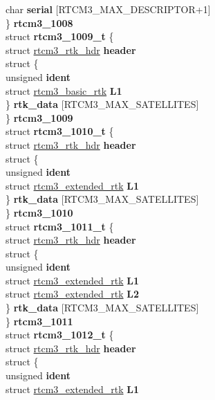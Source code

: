 \begin{DoxyCompactItemize}
{\begin{tabbing}
\>\>char {\bfseries serial} \mbox{[}RTCM3\_MAX\_DESCRIPTOR+1\mbox{]}\\
\>\} {\bfseries rtcm3\_1008}\\
\>struct {\bfseries rtcm3\_1009\_t} \{\\
\>\>struct \hyperlink{structrtcm3__rtk__hdr}{rtcm3\_rtk\_hdr} {\bfseries header}\\
\>\>struct \{\\
\>\>\>unsigned {\bfseries ident}\\
\>\>\>struct \hyperlink{structrtcm3__basic__rtk}{rtcm3\_basic\_rtk} {\bfseries L1}\\
\>\>\} {\bfseries rtk\_data} \mbox{[}RTCM3\_MAX\_SATELLITES\mbox{]}\\
\>\} {\bfseries rtcm3\_1009}\\
\>struct {\bfseries rtcm3\_1010\_t} \{\\
\>\>struct \hyperlink{structrtcm3__rtk__hdr}{rtcm3\_rtk\_hdr} {\bfseries header}\\
\>\>struct \{\\
\>\>\>unsigned {\bfseries ident}\\
\>\>\>struct \hyperlink{structrtcm3__extended__rtk}{rtcm3\_extended\_rtk} {\bfseries L1}\\
\>\>\} {\bfseries rtk\_data} \mbox{[}RTCM3\_MAX\_SATELLITES\mbox{]}\\
\>\} {\bfseries rtcm3\_1010}\\
\>struct {\bfseries rtcm3\_1011\_t} \{\\
\>\>struct \hyperlink{structrtcm3__rtk__hdr}{rtcm3\_rtk\_hdr} {\bfseries header}\\
\>\>struct \{\\
\>\>\>unsigned {\bfseries ident}\\
\>\>\>struct \hyperlink{structrtcm3__extended__rtk}{rtcm3\_extended\_rtk} {\bfseries L1}\\
\>\>\>struct \hyperlink{structrtcm3__extended__rtk}{rtcm3\_extended\_rtk} {\bfseries L2}\\
\>\>\} {\bfseries rtk\_data} \mbox{[}RTCM3\_MAX\_SATELLITES\mbox{]}\\
\>\} {\bfseries rtcm3\_1011}\\
\>struct {\bfseries rtcm3\_1012\_t} \{\\
\>\>struct \hyperlink{structrtcm3__rtk__hdr}{rtcm3\_rtk\_hdr} {\bfseries header}\\
\>\>struct \{\\
\>\>\>unsigned {\bfseries ident}\\
\>\>\>struct \hyperlink{structrtcm3__extended__rtk}{rtcm3\_extended\_rtk} {\bfseries L1}\\

\end{tabbing}}
\end{DoxyCompactItemize}

